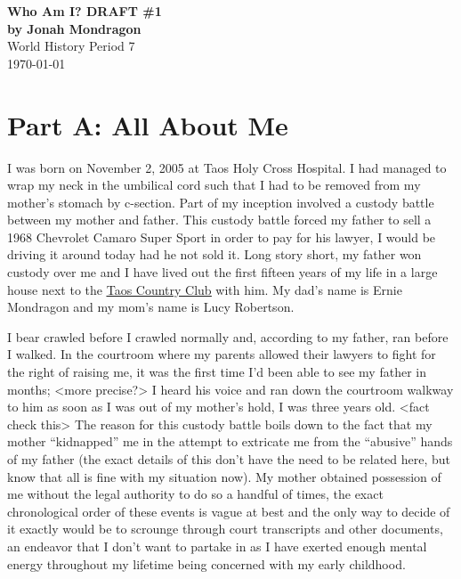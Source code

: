 \documentclass[12pt]{article}
\begin{document}
\doublespacing

\begin{titlepage}
    \begin{center}
        \vspace*{1.5in}
        {\huge\bfseries{Who Am I? DRAFT \#1}}\\
            {\bfseries{by Jonah Mondragon}}\\
            World History Period 7\\
            \today
    \end{center}
\end{titlepage}

\section*{Part A: All About Me}

I was born on November 2, 2005 at Taos Holy Cross Hospital.  I had managed to
wrap my neck in the umbilical cord such that I had to be removed from my
mother's stomach by c-section.  Part of my inception involved a custody battle
between my mother and father.  This custody battle forced my father to sell a
1968 Chevrolet Camaro Super Sport in order to pay for his lawyer, I would be
driving it around today had he not sold it.  Long story short, my father won
custody over me and I have lived out the first fifteen years of my life in a
large house next to the {\color{blue}
\underline{\href{https://www.taoscountryclub.com/}{Taos Country Club}}} with
him. My dad's name is Ernie Mondragon and my mom's name is Lucy Robertson.

I bear crawled before I crawled normally and, according to my father, ran
before I walked.  In the courtroom where my parents allowed their lawyers to
fight for the right of raising me, it was the first time I'd been able to see
my father in months; <more precise?> I heard his voice and ran down the
courtroom walkway to him as soon as I was out of my mother's hold, I was three
years old. <fact check this> The reason for this custody battle boils down to
the fact that my mother ``kidnapped'' me in the attempt to extricate me from
the ``abusive'' hands of my father (the exact details of this don't have the
need to be related here, but know that all is fine with my situation now).  My
mother obtained possession of me without the legal authority to do so a handful
of times, the exact chronological order of these events is vague at best and
the only way to decide of it exactly would be to scrounge through court
transcripts and other documents, an endeavor that I don't want to partake in as
I have exerted enough mental energy throughout my lifetime being concerned with
my early childhood.
\end{document}
